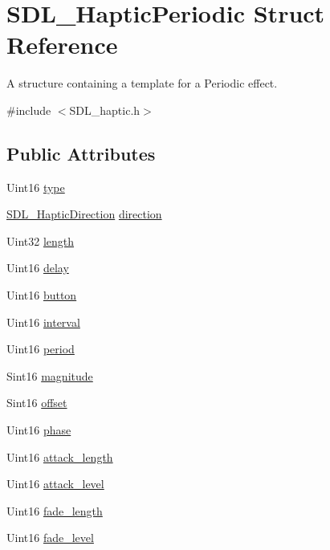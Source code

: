 \hypertarget{struct_s_d_l___haptic_periodic}{}\section{S\+D\+L\+\_\+\+Haptic\+Periodic Struct Reference}
\label{struct_s_d_l___haptic_periodic}


A structure containing a template for a Periodic effect.  




{\ttfamily \#include $<$S\+D\+L\+\_\+haptic.\+h$>$}

\subsection*{Public Attributes}
\begin{DoxyCompactItemize}
\item 
Uint16 \mbox{\hyperlink{struct_s_d_l___haptic_periodic_ac53c5725e8cff012e9b90e01b7110869}{type}}
\item 
\mbox{\hyperlink{struct_s_d_l___haptic_direction}{S\+D\+L\+\_\+\+Haptic\+Direction}} \mbox{\hyperlink{struct_s_d_l___haptic_periodic_a2c4f27d4583187a7a994e79ad49083d3}{direction}}
\item 
Uint32 \mbox{\hyperlink{struct_s_d_l___haptic_periodic_a0ef0b17c54aaa5c99886c2a618444026}{length}}
\item 
Uint16 \mbox{\hyperlink{struct_s_d_l___haptic_periodic_a8688d1c7ee6270ed290f6b474aef5ec9}{delay}}
\item 
Uint16 \mbox{\hyperlink{struct_s_d_l___haptic_periodic_a9e0177354f4a285b8c98e4a31cd31752}{button}}
\item 
Uint16 \mbox{\hyperlink{struct_s_d_l___haptic_periodic_a076d266e917098d89b2385b631629162}{interval}}
\item 
Uint16 \mbox{\hyperlink{struct_s_d_l___haptic_periodic_a0e7e105b96308129b248d52b56a2a839}{period}}
\item 
Sint16 \mbox{\hyperlink{struct_s_d_l___haptic_periodic_aad0ad2b00c7e6959da627663d91f7b94}{magnitude}}
\item 
Sint16 \mbox{\hyperlink{struct_s_d_l___haptic_periodic_abc7aa9e9c0d546cb54189a7812fbe554}{offset}}
\item 
Uint16 \mbox{\hyperlink{struct_s_d_l___haptic_periodic_a25e8c6aebc78bd74b9343fa228d25d8f}{phase}}
\item 
Uint16 \mbox{\hyperlink{struct_s_d_l___haptic_periodic_ab35eedce7107edc75640586159fe75bb}{attack\+\_\+length}}
\item 
Uint16 \mbox{\hyperlink{struct_s_d_l___haptic_periodic_a79fc2217fea6db6ab3d89ad905d52ccb}{attack\+\_\+level}}
\item 
Uint16 \mbox{\hyperlink{struct_s_d_l___haptic_periodic_ae1c186d02304eae142a62dca72f50fa8}{fade\+\_\+length}}
\item 
Uint16 \mbox{\hyperlink{struct_s_d_l___haptic_periodic_afa7713fc264959873f2a852fca4174fd}{fade\+\_\+level}}
\end{DoxyCompactItemize}


